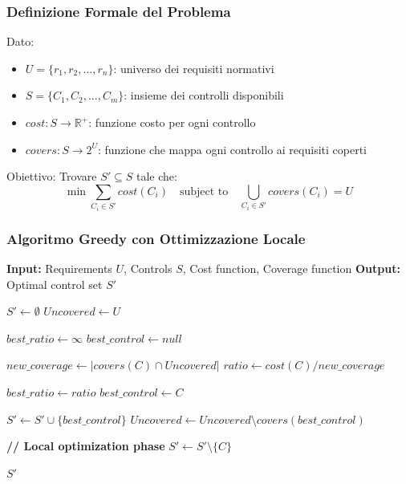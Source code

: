 \subsubsection{Definizione Formale del Problema}

Dato:
\begin{itemize}
    \item $U = \{r_1, r_2, ..., r_n\}$: universo dei requisiti normativi
    \item $S = \{C_1, C_2, ..., C_m\}$: insieme dei controlli disponibili
    \item $cost: S \rightarrow \mathbb{R}^+$: funzione costo per ogni controllo
    \item $covers: S \rightarrow 2^U$: funzione che mappa ogni controllo ai requisiti coperti
\end{itemize}

Obiettivo: Trovare $S' \subseteq S$ tale che:
\begin{equation}
    \min \sum_{C_i \in S'} cost(C_i) \quad \text{subject to} \quad \bigcup_{C_i \in S'} covers(C_i) = U
\end{equation}

\subsubsection{Algoritmo Greedy con Ottimizzazione Locale}

\begin{algorithm}
\caption{Compliance Set-Covering Optimization}
\begin{algorithmic}[1]
\State \textbf{Input:} Requirements $U$, Controls $S$, Cost function, Coverage function
\State \textbf{Output:} Optimal control set $S'$

\State $S' \leftarrow \emptyset$
\State $Uncovered \leftarrow U$

    \State $best\_ratio \leftarrow \infty$
    \State $best\_control \leftarrow null$
    
        \State $new\_coverage \leftarrow |covers(C) \cap Uncovered|$
        \State $ratio \leftarrow cost(C) / new\_coverage$
        
            \State $best\_ratio \leftarrow ratio$
            \State $best\_control \leftarrow C$
        \EndIf
    \EndFor
    
    \State $S' \leftarrow S' \cup \{best\_control\}$
    \State $Uncovered \leftarrow Uncovered \setminus covers(best\_control)$
\EndWhile

\State \textbf{// Local optimization phase}
        \State $S' \leftarrow S' \setminus \{C\}$
    \EndIf
\EndFor

\State \Return $S'$
\end{algorithmic}
\end{algorithm}

